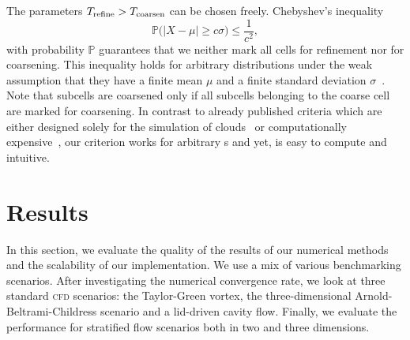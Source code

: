 \documentclass[runningheads]{llncs}
\begin{document}
The parameters $T_\text{refine} > T_\text{coarsen}$ can be chosen freely.
Chebyshev's inequality
\begin{equation}
  \label{eq:chebychev}
  \mathbb{P}\bigl(\vert X - \mu \vert \geq c \sigma \bigr) \leq \frac{1}{c^2},
\end{equation}
with probability $\mathbb{P}$ guarantees that we neither mark all cells for refinement nor for coarsening.
This inequality holds for arbitrary distributions under the weak assumption that they have a finite mean $\mu$ and a finite standard deviation $\sigma$~\cite{wasserman2004all}.
Note that subcells are coarsened only if all subcells belonging to the coarse cell are marked for coarsening.
In contrast to already published criteria which are either designed solely for the simulation of clouds~\cite{muller2010adaptive} or computationally expensive~\cite{fambri2017space}, our criterion works for arbitrary \pde{}s and yet, is easy to compute and intuitive.

\section{Results}
In this section, we evaluate the quality of the results of our numerical methods and the scalability of our implementation.
We use a mix of various benchmarking scenarios.
After investigating the numerical convergence rate, we look at three standard \textsc{cfd} scenarios: the Taylor-Green vortex, the three-dimensional Arnold-Beltrami-Childress scenario and a lid-driven cavity flow.
Finally, we evaluate the performance for stratified flow scenarios both in two and three dimensions.
\end{document}
